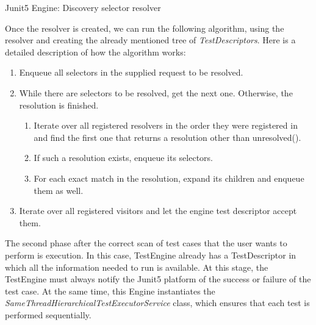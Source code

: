 \begin{algorithm}[H]
    \label{02:alg:selectorresolver}
    \caption{Junit5 Engine: Discovery selector resolver}
    \begin{algorithmic}[1]
		\EndProcedure
    \end{algorithmic}
\end{algorithm}

Once the resolver is created, we can run the following algorithm, using the resolver and creating the already mentioned tree of \emph{TestDescriptors}. Here is a detailed description of how the algorithm works:

\begin{enumerate}[itemsep=1mm, parsep=0pt]
    \item Enqueue all selectors in the supplied request to be resolved.
    \item While there are selectors to be resolved, get the next one. Otherwise, the resolution is finished.
    \begin{enumerate}
        \item Iterate over all registered resolvers in the order they were registered in and find the first one that returns a resolution other than unresolved().
        \item If such a resolution exists, enqueue its selectors.
        \item For each exact match in the resolution, expand its children and enqueue them as well.
    \end{enumerate}
    \item Iterate over all registered visitors and let the engine test descriptor accept them.
\end{enumerate}

The second phase after the correct scan of test cases that the user wants to perform is execution. In this case, TestEngine already has a TestDescriptor in which all the information needed to run is available. At this stage, the TestEngine must always notify the Junit5 platform of the success or failure of the test case. At the same time, this Engine instantiates the \emph{SameThreadHierarchicalTestExecutorService} class, which ensures that each test is performed sequentially.

